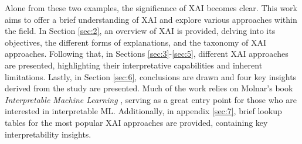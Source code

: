 Alone from these two examples, the significance of XAI becomes clear. This work aims to offer a brief understanding of XAI and explore various approaches within the field.
In Section \ref{sec:2}, an overview of XAI is provided, delving into its objectives, the different forms of explanations, and the taxonomy of XAI approaches.
Following that, in Sections \ref{sec:3}-\ref{sec:5}, different XAI approaches are presented, highlighting their interpretative capabilities and inherent limitations.
Lastly, in Section \ref{sec:6}, conclusions are drawn and four key insights derived from the study are presented.
Much of the work relies on Molnar's book \textit{Interpretable Machine Learning} \cite{molnar2022}, serving as a great entry point for those who are interested in interpretable ML.
Additionally, in appendix \ref{sec:7}, brief lookup tables for the most popular XAI approaches are provided, containing key interpretability insights.
